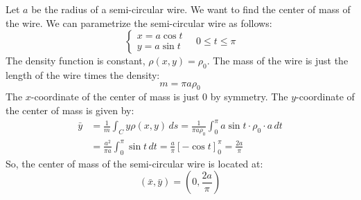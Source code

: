 \documentclass[11pt]{report}
\begin{document}
\begin{example}
    Let $a$ be the radius of a semi-circular wire. We want to find the center of mass of the wire. We can parametrize the semi-circular wire as follows:
    $$
    \begin{cases}
        x = a \cos t \\
        y = a \sin t
    \end{cases} \quad 0 \leq t \leq \pi
    $$
    The density function is constant, $\rho(x,y) = \rho_0$. The mass of the wire is just the length of the wire times the density:
    $$
        m = \pi a \rho_0
    $$
    The $x$-coordinate of the center of mass is just 0 by symmetry. The $y$-coordinate of the center of mass is given by:
    \begin{align*}
        \bar{y} &= \frac{1}{m} \int_C y \rho(x,y) \, ds = \frac{1}{\pi a \rho_0} \int_0^\pi a \sin t \cdot \rho_0 \cdot a \, dt \\
        &= \frac{a^2}{\pi a} \int_0^\pi \sin t \, dt = \frac{a}{\pi} \left[ -\cos t \right]_0^\pi = \frac{2a}{\pi}
    \end{align*}
    So, the center of mass of the semi-circular wire is located at:
    $$
        \left( \bar{x}, \bar{y} \right) = \left( 0, \frac{2a}{\pi} \right)
    $$
\end{example}
\end{document}
